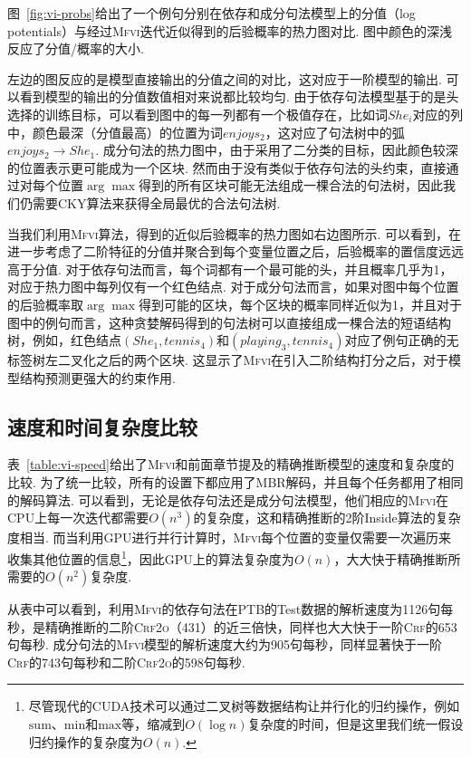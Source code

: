 图~\ref{fig:vi-probs}给出了一个例句分别在依存和成分句法模型上的分值（log potentials）与经过\textsc{Mfvi}迭代近似得到的后验概率的热力图对比.
图中颜色的深浅反应了分值/概率的大小.

左边的图反应的是模型直接输出的分值之间的对比，这对应于一阶模型的输出.
可以看到模型的输出的分值数值相对来说都比较均匀.
由于依存句法模型基于的是头选择的训练目标，可以看到图中的每一列都有一个极值存在，比如词$She_i$对应的列中，颜色最深（分值最高）的位置为词$enjoys_2$，这对应了句法树中的弧$enjoys_2\rightarrow She_1$.
成分句法的热力图中，由于采用了二分类的目标，因此颜色较深的位置表示更可能成为一个区块.
然而由于没有类似于依存句法的头约束，直接通过对每个位置$\arg\max$得到的所有区块可能无法组成一棵合法的句法树，因此我们仍需要CKY算法来获得全局最优的合法句法树.

当我们利用\textsc{Mfvi}算法，得到的近似后验概率的热力图如右边图所示.
可以看到，在进一步考虑了二阶特征的分值并聚合到每个变量位置之后，后验概率的置信度远远高于分值.
对于依存句法而言，每个词都有一个最可能的头，并且概率几乎为1，对应于热力图中每列仅有一个红色结点.
对于成分句法而言，如果对图中每个位置的后验概率取$\arg\max$得到可能的区块，每个区块的概率同样近似为1，并且对于图中的例句而言，这种贪婪解码得到的句法树可以直接组成一棵合法的短语结构树，例如，红色结点$(She_1,tennis_4)$和$(playing_3,tennis_4)$对应了例句正确的无标签树左二叉化之后的两个区块.
这显示了\textsc{Mfvi}在引入二阶结构打分之后，对于模型结构预测更强大的约束作用.


\subsection{速度和时间复杂度比较}
\label{sub@sec:vi-speed}

表~\ref{table:vi-speed}给出了\textsc{Mfvi}和前面章节提及的精确推断模型的速度和复杂度的比较.
为了统一比较，所有的设置下都应用了MBR解码，并且每个任务都用了相同的解码算法.
可以看到，无论是依存句法还是成分句法模型，他们相应的\textsc{Mfvi}在CPU上每一次迭代都需要$O(n^3)$的复杂度，这和精确推断的2阶Inside算法的复杂度相当.
而当利用GPU进行并行计算时，\textsc{Mfvi}每个位置的变量仅需要一次遍历来收集其他位置的信息\footnote{尽管现代的CUDA技术可以通过二叉树等数据结构让并行化的归约操作，例如$\mathrm{sum}$、$\mathrm{min}$和$\mathrm{max}$等，缩减到$O(\log n)$复杂度的时间\citep{wang-etal-2020-ain}，但是这里我们统一假设归约操作的复杂度为$O(n)$.}，因此GPU上的算法复杂度为$O(n)$，大大快于精确推断所需要的$O(n^2)$复杂度.

从表中可以看到，利用\textsc{Mfvi}的依存句法在PTB的Test数据的解析速度为1126句每秒，是精确推断的二阶\textsc{Crf2o}（431）的近三倍快，同样也大大快于一阶\textsc{Crf}的653句每秒.
成分句法的\textsc{Mfvi}模型的解析速度大约为905句每秒，同样显著快于一阶\textsc{Crf}的743句每秒和二阶\textsc{Crf2o}的598句每秒.

